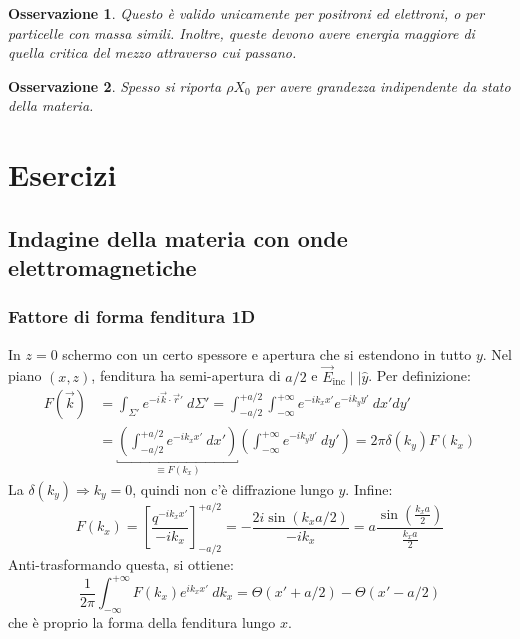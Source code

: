 \documentclass[10pt, a4paper]{scrartcl}
\numberwithin{equation}{subsection}
\theoremstyle{style1}
\newtheorem{osservazione}{Osservazione}[section]
\begin{document}
\begin{osservazione}
	Questo \`e valido unicamente per positroni ed elettroni, o per particelle con massa simili. Inoltre, queste devono avere energia maggiore di quella critica del mezzo attraverso cui passano.
\end{osservazione}

\begin{osservazione}
	Spesso si riporta $\rho X_0$ per avere grandezza indipendente da stato della materia.
\end{osservazione}















\newpage
\section{Esercizi}

\subsection{Indagine della materia con onde elettromagnetiche}
\subsubsection{Fattore di forma fenditura 1D}
In $z=0$ schermo con un certo spessore e apertura che si estendono in tutto $y$. Nel piano $(x,z)$, fenditura ha semi-apertura di $a / 2$ e $\vec{E}_\text{inc} \mid  \mid \hat{y}$. Per definizione:
\begin{equation}
	\begin{split}
		F(\vec{k}) &= \int_{\Sigma'} e^{-i \vec{k}\cdot \vec{r}'} \ d\Sigma ' = \int_{-a / 2}^{+ a / 2}  \int_{-\infty} ^{+\infty} e^{-ik_x x'} e^{-ik_y y'}  \ dx' dy'\\
			   &= \underbracket{\left(\int_{- a / 2}^{+a / 2}  e^{-i k_x x'} \ dx'\right)}_{\equiv F(k_x)}  \left(\int_{-\infty} ^{+\infty} e^{-ik_y y'}  \ dy'\right) = 2\pi \delta (k_y)F(k_x)
	\end{split}
\end{equation}
La $\delta (k_y) \Rightarrow k_y=0$, quindi non c'\`e diffrazione lungo $y$. Infine:
\begin{equation}
	F(k_x) = \left[ \frac{q^{-ik_x x'} }{-ik_x} \right] ^{+ a / 2} _{- a /2}  = -\frac{2i \sin(k_x a / 2)}{- i k_x}= a\frac{\sin\left(\frac{k_x a }{2}\right) }{\frac{k_x a }{2}}
\end{equation}
Anti-trasformando questa, si ottiene:
\begin{equation}
	\frac{1}{2\pi} \int_{-\infty} ^{+\infty} F(k_x) e^{ik_x x'} \ dk_x= \Theta(x'+ a / 2) - \Theta (x' - a/2)
\end{equation}
che \`e proprio la forma della fenditura lungo $x$.
\end{document}
